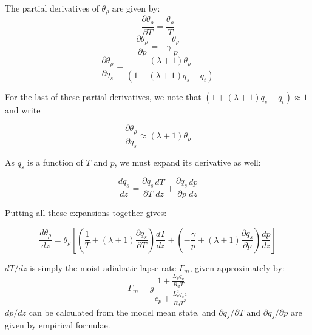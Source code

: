 \documentclass[acp]{copernicus}
\begin{document}
The partial derivatives of $\theta_\rho$ are given by:
\begin{equation}
  \frac{\partial \theta_\rho}{\partial T} = \frac{\theta_\rho}{T}
\end{equation}
\begin{equation}
  \frac{\partial \theta_\rho}{\partial p} = -\gamma \frac{\theta_\rho}{p}
\end{equation}
\begin{equation}
  \frac{\partial \theta_\rho}{\partial q_s} = \frac{(\lambda + 1)\theta_\rho}{(1 + (\lambda + 1)q_s - q_t)}
\end{equation}

For the last of these partial derivatives, we note that 
$(1 + (\lambda + 1)q_s - q_t) \approx 1$ and write

\begin{equation}
  \frac{\partial \theta_\rho}{\partial q_s} \approx (\lambda + 1) \theta_\rho 
\end{equation}

As $q_s$ is a function of $T$ and $p$, we must expand its derivative as 
well:

\begin{equation}
\label{eq:q_s_derivative}
  \frac{d q_s}{dz} = \frac{\partial q_s}{\partial T}\frac{dT}{dz}
                          + \frac{\partial q_s}{\partial p}\frac{dp}{dz}
\end{equation}

Putting all these expansions together gives:

\begin{equation}
\label{eq:density_potential_temperature_gradient_2}
  \frac{d \theta_\rho}{dz} = \theta_\rho \left[ 
                               \left( \frac{1}{T} + (\lambda + 1)\frac{\partial q_s}{\partial T} \right)\frac{dT}{dz}
                             + \left( -\frac{\gamma}{p} + (\lambda + 1)\frac{\partial q_s}{\partial p} \right)\frac{dp}{dz}
                             \right]
\end{equation}

$dT/dz$ is simply the moist adiabatic lapse rate $\Gamma_m$, given 
approximately by:
\begin{equation}
\Gamma_m = g\frac{1 + \frac{L_v q_v}{R_d T}}{c_p + \frac{L_v^2 q_v \epsilon}{R_d T^2}}
\end{equation}
$dp/dz$ can be calculated from the model mean state, and 
$\partial q_s/\partial T$ and $\partial q_s/\partial p$ are given
by empirical formulae.


\end{document}
